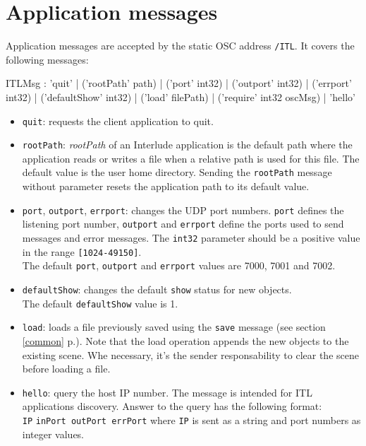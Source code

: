 \documentclass[a4paper,twoside]{report}
\newcommand{\toplevel}[1]	{\chapter{#1}}
\newcommand{\fullref}[1]	{\ref{#1} p.\pageref{#1}}
\newcommand{\OSC}[1]		{\texttt{#1}}
\newcommand{\values}[1]	{\texttt{#1}}
\newcommand{\example}		{\hspace*{1cm}}
\begin{document}
\toplevel{Application messages}
\label{ITL}
Application messages are accepted by the static OSC address \OSC{/ITL}. It covers the following messages:
\begin{rail}
ITLMsg : 'quit' 
		| ('rootPath' path) 
		| ('port' int32)
		| ('outport' int32)
		| ('errport' int32)
		| ('defaultShow' int32)
		| ('load' filePath)
		| ('require' int32 oscMsg)
		| 'hello'
\end{rail}


\begin{itemize}
\item \OSC{quit}: requests the client application to quit.

\item \OSC{rootPath}: \emph{rootPath} of an Interlude application is the default path where the application reads or writes a file when a relative path is used for this file. The default value is the user home directory. Sending the \OSC{rootPath} message without parameter resets the application path to its default value.

\item \OSC{port}, \OSC{outport}, \OSC{errport}: changes the UDP port numbers. \OSC{port} defines the listening port number, \OSC{outport} and \OSC{errport} define the ports used to send messages and error messages. The \OSC{int32} parameter should be a positive value in the range \values{[1024-49150]}. \\
The default \OSC{port}, \OSC{outport} and \OSC{errport} values are 7000, 7001 and 7002.

\item \OSC{defaultShow}: changes the default \OSC{show} status for new objects. \\
The default \OSC{defaultShow} value is 1.

\item \OSC{load}: loads a file previously saved using the \OSC{save} message (see section \fullref{common}). Note that the load operation appends the new objects to the existing scene. Whe necessary, it's the sender responsability to clear the scene before loading a file.

\item \OSC{hello}: query the host IP number. The message is intended for ITL applications discovery. Answer to the query has the following format: \\
\example \OSC{IP} \OSC{inPort outPort errPort} where \OSC{IP} is sent as a string and port numbers as integer values.


\end{itemize}
\end{document}
